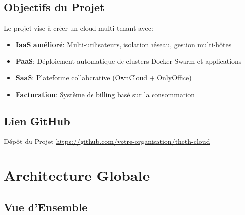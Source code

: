\documentclass[12pt,a4paper]{article}
\begin{document}
\subsection{Objectifs du Projet}

Le projet vise à créer un cloud multi-tenant avec:
\begin{itemize}[leftmargin=*, itemsep=0.3em]
    \item \textbf{IaaS amélioré}: Multi-utilisateurs, isolation réseau, gestion multi-hôtes
    \item \textbf{PaaS}: Déploiement automatique de clusters Docker Swarm et applications
    \item \textbf{SaaS}: Plateforme collaborative (OwnCloud + OnlyOffice)
    \item \textbf{Facturation}: Système de billing basé sur la consommation
\end{itemize}

\subsection{Lien GitHub}

\begin{successbox}{Dépôt du Projet}
\centering
\url{https://github.com/votre-organisation/thoth-cloud}
\end{successbox}

\section{Architecture Globale}

\subsection{Vue d'Ensemble}
\end{document}
